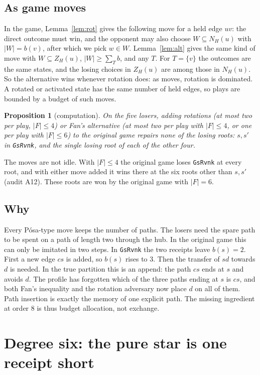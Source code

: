 \documentclass[11pt]{amsart}
\newtheorem{proposition}[theorem]{Proposition}
\theoremstyle{definition}
\begin{document}
\subsection*{As game moves} In the game, Lemma~\ref{lem:rot} gives the following move for a held
edge $uv$: the direct outcome must win, and the opponent may also choose $W\subseteq N_H(u)$ with
$|W|=b(v)$, after which we pick $w\in W$. Lemma~\ref{lem:alt} gives the same kind of move with
$W\subseteq Z_H(u)$, $|W|\ge\sum_Tb$, and any $T$. For $T=\{v\}$ the outcomes are the same states,
and the losing choices in $Z_H(u)$ are among those in $N_H(u)$. So the alternative wins whenever
rotation does: as moves, rotation is dominated. A rotated or activated state has the same number of
held edges, so plays are bounded by a budget of such moves.

\begin{proposition}[computation]\label{prop:posa}
On the five losers, adding rotations (at most two per play, $|F|\le4$) or Fan's alternative (at most
two per play with $|F|\le4$, or one per play with $|F|\le6$) to the original game repairs
\emph{none} of the losing roots: $s,s'$ in \texttt{GsRvnk}, and the single losing root of each of
the other four.
\end{proposition}
The moves are not idle. With $|F|\le4$ the original game loses \texttt{GsRvnk} at every root, and
with either move added it wins there at the six roots other than $s,s'$ (audit A12). These roots
are won by the original game with $|F|=6$.

\subsection*{Why} Every P\'osa-type move keeps the number of paths. The losers need the spare
path to be spent on a path of length two through the hub. In the original game this can only be
imitated in two steps. In \texttt{GsRvnk} the two receipts leave $b(s)=2$. First a new edge $cs$
is added, so $b(s)$ rises to $3$. Then the
transfer of $sd$ towards $d$ is needed. In the true partition this is an append: the path $cs$
ends at $s$ and avoids $d$. The profile has forgotten which of the three paths ending at $s$ is
$cs$, and both Fan's inequality and the rotation adversary now place $d$ on all of them. Path
insertion is exactly the memory of one explicit path. The missing ingredient at order $8$ is thus
budget allocation, not exchange.

\section{Degree six: the pure star is one receipt short}\label{sec:six}
\end{document}
